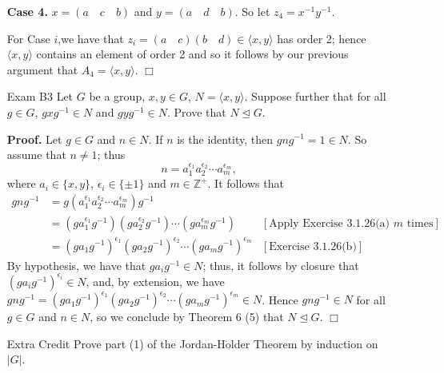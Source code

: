 \documentclass[9pt]{article}
\newcommand{\qed}{\hfill \ensuremath{\Box}}
\newcommand{\cyc}[1]{\langle #1 \rangle}
\newcommand{\Z}{\mathbb{Z}}
\begin{document}
\begin{enumerate}
      \textbf{Case 4.} $x = (a \quad c \quad b)$ and $y = (a \quad d \quad b)$.      
      So let $z_4 = x^{-1}y^{-1}$.
      
      For Case $i$,we have that $z_i =  (a \quad c)(b \quad d) \in \cyc{x, y}$
      has order 2; hence $\cyc{x, y}$ contains an element of order 2 and so it
      follows by our previous argument that $A_4 = \cyc{x, y}$. \qed
   \item[Exam B3] Let $G$ be a group, $x, y \in G$, $N = \cyc{x, y}$. Suppose
                  further that for all $g \in G$, $gxg^{-1} \in N$ and
                  $gyg^{-1} \in N$. Prove that $N \trianglelefteq G$.
                  
      \textbf{Proof.} Let $g \in G$ and $n \in N$. If $n$ is the identity, then
      $gng^{-1} = 1 \in N$. So assume that $n \neq 1$; thus
      $$n = a_1^{\epsilon_1}a_2^{\epsilon_2}\cdots a_m^{\epsilon_m},$$
      where $a_i \in \{x, y\}$, $\epsilon_i \in \{\pm1\}$ and $m \in \Z^+$. It
      follows that
      \begin{align*}
         gng^{-1} &= g(a_1^{\epsilon_1}a_2^{\epsilon_2}\cdots
            a_m^{\epsilon_m})g^{-1} \\
            &= (ga_1^{\epsilon_1}g^{-1})(ga_2^{\epsilon_2}g^{-1})\cdots
            (ga_m^{\epsilon_m}g^{-1}) &[\text{Apply Exercise 3.1.26(a) } m
               \text{ times}] \\
            &= (ga_1g^{-1})^{\epsilon_1}(ga_2g^{-1})^{\epsilon_2}\cdots
            (ga_mg^{-1})^{\epsilon_m} &[\text{Exercise 3.1.26(b)}]
      \end{align*}
      By hypothesis, we have that $ga_ig^{-1} \in N$; thus, it follows by
      closure that $(ga_ig^{-1})^{\epsilon_i} \in N$, and, by extension, we have
      $gng^{-1} = (ga_1g^{-1})^{\epsilon_1}(ga_2g^{-1})^{\epsilon_2}\cdots
            (ga_mg^{-1})^{\epsilon_m} \in N$. Hence $gng^{-1} \in N$ for all
      $g \in G$ and $n \in N$, so we conclude by Theorem 6 (5) that
      $N \trianglelefteq G$. \qed
   \item[Extra Credit]  Prove part (1) of the Jordan-H$\ddot{\text{o}}$lder Theorem by induction
                        on $|G|$.
\end{enumerate}
\end{document}
